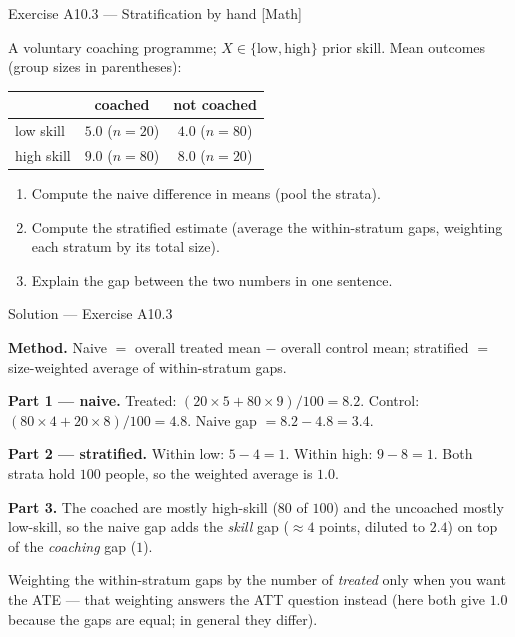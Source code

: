 \documentclass[aspectratio=169,11pt]{beamer}
\begin{document}
\begin{frame}{Exercise A10.3 --- Stratification by hand [Math]}
  \begin{exercise}
    A voluntary coaching programme; $X \in \{\text{low}, \text{high}\}$ prior skill.
    Mean outcomes (group sizes in parentheses):
    \begin{center}
    \footnotesize
    \begin{tabular}{@{}lcc@{}}
      \toprule
      & \textbf{coached} & \textbf{not coached} \\
      \midrule
      low skill  & $5.0$ \;($n=20$) & $4.0$ \;($n=80$) \\
      high skill & $9.0$ \;($n=80$) & $8.0$ \;($n=20$) \\
      \bottomrule
    \end{tabular}
    \end{center}
    \begin{enumerate}
      \item Compute the naive difference in means (pool the strata).
      \item Compute the stratified estimate (average the within-stratum gaps,
            weighting each stratum by its total size).
      \item Explain the gap between the two numbers in one sentence.
    \end{enumerate}
  \end{exercise}
\end{frame}

\begin{frame}{Solution --- Exercise A10.3}
  \begin{solutionbox}
    \footnotesize
    \textbf{Method.} Naive $=$ overall treated mean $-$ overall control mean;
    stratified $=$ size-weighted average of within-stratum gaps.
    \par\smallskip
    \textbf{Part 1 --- naive.} Treated: $(20 \times 5 + 80 \times 9)/100 = 8.2$.
    Control: $(80 \times 4 + 20 \times 8)/100 = 4.8$. Naive gap
    $= 8.2 - 4.8 = \mathbf{3.4}$.
    \par\smallskip
    \textbf{Part 2 --- stratified.} Within low: $5 - 4 = 1$. Within high: $9 - 8 = 1$.
    Both strata hold $100$ people, so the weighted average is $\mathbf{1.0}$.
    \par\smallskip
    \textbf{Part 3.} The coached are mostly high-skill ($80$ of $100$) and the
    uncoached mostly low-skill, so the naive gap adds the \emph{skill} gap
    ($\approx 4$ points, diluted to $2.4$) on top of the \emph{coaching} gap ($1$).
  \end{solutionbox}
  \begin{mistake}
    Weighting the within-stratum gaps by the number of \emph{treated} only when you
    want the ATE --- that weighting answers the ATT question instead (here both give
    $1.0$ because the gaps are equal; in general they differ).
  \end{mistake}
\end{frame}
\end{document}
